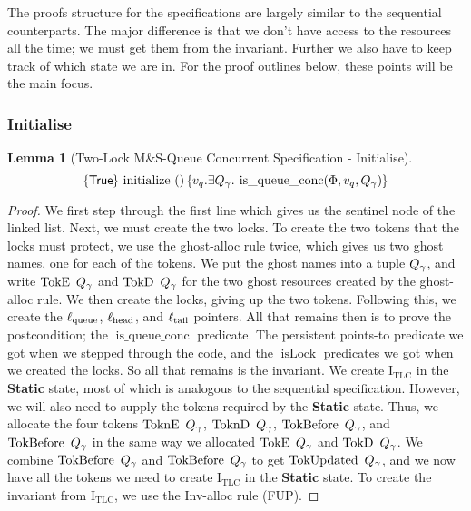 \documentclass[a4paper, 10pt]{report}
\theoremstyle{definition}
\newtheorem{lemma}[theorem]{Lemma}
\newcommand{\isLock}{\operatorname{isLock}}
\newcommand{\initialise}{\operatorname{initialize}}
\newcommand{\msq}{M\&S-Queue\xspace}
\newcommand{\tlmsq}{Two-Lock \msq}
\newcommand{\isqueueconc}{\operatorname{is\_queue\_conc}}
\newcommand{\TLQueueInvariantConc}{\operatorname{I_{TLC}}}
\newcommand{\vq}{v_q}
\newcommand{\locN}[1]{\loc_{\mathrm{#1}}}
\newcommand{\lochead}{\locN{head}}
\newcommand{\loctail}{\locN{tail}}
\newcommand{\locqueue}{\locN{queue}}
\newcommand{\StaticState}{\textbf{Static}}
\newcommand{\Qg}{Q_\gname}
\newcommand{\TokE}[1]{\operatorname{TokE} ~ #1}
\newcommand{\TokEQg}{\TokE{\Qg}}
\newcommand{\ToknE}[1]{\operatorname{ToknE} ~ #1}
\newcommand{\ToknEQg}{\ToknE{\Qg}}
\newcommand{\TokD}[1]{\operatorname{TokD} ~ #1}
\newcommand{\TokDQg}{\TokD{\Qg}}
\newcommand{\ToknD}[1]{\operatorname{ToknD} ~ #1}
\newcommand{\ToknDQg}{\ToknD{\Qg}}
\newcommand{\TokBefore}[1]{\operatorname{TokBefore} ~ #1}
\newcommand{\TokBeforeQg}{\TokBefore{\Qg}}
\newcommand{\TokAfterQg}{\TokBefore{\Qg}}
\newcommand{\TokUpdated}[1]{\operatorname{TokUpdated} ~ #1}
\newcommand{\TokUpdatedQg}{\TokUpdated{\Qg}}
\newcommand{\tlconcspecinit}{\hoare{\TRUE}{\initialise \ \TT}{\vq . \Exists \Qg. \isqueueconc(\Phi, \vq, \Qg)}}
\begin{document}
The proofs structure for the specifications are largely similar to the sequential counterparts. The major difference is that we don't have access to the resources all the time; we must get them from the invariant. Further we also have to keep track of which state we are in. For the proof outlines below, these points will be the main focus.

\subsubsection{Initialise}
\begin{lemma}[\tlmsq Concurrent Specification - Initialise]\label{TLMSQ:spec:conc:init}
  \begin{equation*}
    \tlconcspecinit
  \end{equation*}
\end{lemma}
\begin{proof}
We first step through the first line which gives us the sentinel node of the linked list. Next, we must create the two locks. To create the two tokens that the locks must protect, we use the ghost-alloc rule twice, which gives us two ghost names, one for each of the tokens. We put the ghost names into a tuple $\Qg$, and write $\TokEQg$ and $\TokDQg$ for the two ghost resources created by the ghost-alloc rule. We then create the locks, giving up the two tokens. Following this, we create the $\locqueue$, $\lochead$, and $\loctail$ pointers. All that remains then is to prove the postcondition; the $\isqueueconc$ predicate. The persistent points-to predicate we got when we stepped through the code, and the $\isLock$ predicates we got when we created the locks. So all that remains is the invariant. We create $\TLQueueInvariantConc$ in the \StaticState{} state, most of which is analogous to the sequential specification. However, we will also need to supply the tokens required by the \StaticState{} state. Thus, we allocate the four tokens $\ToknEQg$, $\ToknDQg$, $\TokBeforeQg$, and $\TokAfterQg$ in the same way we allocated $\TokEQg$ and $\TokDQg$. We combine $\TokBeforeQg$ and $\TokAfterQg$ to get $\TokUpdatedQg$, and we now have all the tokens we need to create $\TLQueueInvariantConc$ in the \StaticState{} state. To create the invariant from $\TLQueueInvariantConc$, we use the Inv-alloc rule (FUP).
\end{proof}
\end{document}
